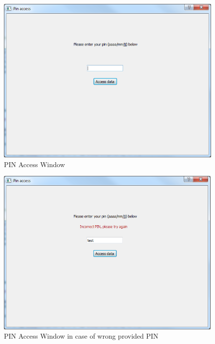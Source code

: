 \begin{figure}[ht]
\centering
\includegraphics[width = 0.68\hsize]{./figures/screenshot/PinAccess1}
\caption{PIN Access Window }
\end{figure}
	

\begin{figure}[ht]
\centering
\includegraphics[width = 0.68\hsize]{./figures/screenshot/PinAccess2}
\caption{PIN Access Window in case of wrong provided PIN}
\end{figure}